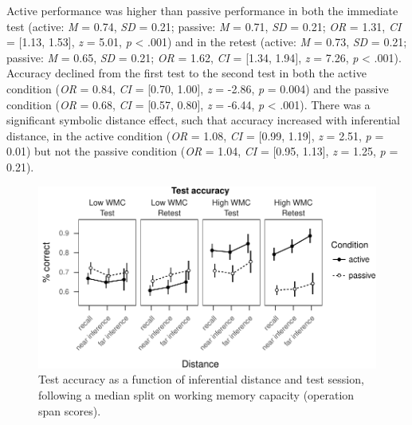 \documentclass[floatsintext,man]{apa6}
\theoremstyle{definition}
\theoremstyle{definition}
\theoremstyle{definition}
\theoremstyle{remark}
\begin{document}
Active performance was higher than passive performance in both the
immediate test (active: \emph{M} = 0.74, \emph{SD} = 0.21; passive:
\emph{M} = 0.71, \emph{SD} = 0.21; \emph{OR} = 1.31, \emph{CI} =
{[}1.13, 1.53{]}, \emph{z} = 5.01, \emph{p} \textless{} .001) and in the
retest (active: \emph{M} = 0.73, \emph{SD} = 0.21; passive: \emph{M} =
0.65, \emph{SD} = 0.21; \emph{OR} = 1.62, \emph{CI} = {[}1.34, 1.94{]},
\emph{z} = 7.26, \emph{p} \textless{} .001). Accuracy declined from the
first test to the second test in both the active condition (\emph{OR} =
0.84, \emph{CI} = {[}0.70, 1.00{]}, \emph{z} = -2.86, \emph{p} = 0.004)
and the passive condition (\emph{OR} = 0.68, \emph{CI} = {[}0.57,
0.80{]}, \emph{z} = -6.44, \emph{p} \textless{} .001). There was a
significant symbolic distance effect, such that accuracy increased with
inferential distance, in the active condition (\emph{OR} = 1.08,
\emph{CI} = {[}0.99, 1.19{]}, \emph{z} = 2.51, \emph{p} = 0.01) but not
the passive condition (\emph{OR} = 1.04, \emph{CI} = {[}0.95, 1.13{]},
\emph{z} = 1.25, \emph{p} = 0.21).

\begin{figure}
\centering
\includegraphics{active_transitive_inference_files/figure-latex/unnamed-chunk-3-1.pdf}
\caption{\label{fig:unnamed-chunk-3}Test accuracy as a function of
inferential distance and test session, following a median split on
working memory capacity (operation span scores). \label{fig_acc}}
\end{figure}
\end{document}
